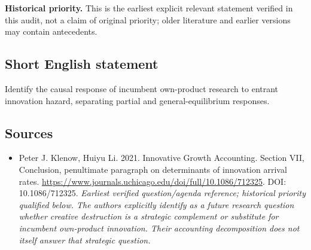 \documentclass[11pt]{article}
\begin{document}
\par\textbf{Historical priority.} This is the earliest explicit relevant statement verified in this audit, not a claim of original priority; older literature and earlier versions may contain antecedents.

\subsection{Short English statement}
Identify the causal response of incumbent own-product research to entrant innovation hazard, separating partial and general-equilibrium responses.

\subsection{Sources}
\begin{itemize}\raggedright
\item[\textnormal{[S1]}]\hypertarget{source:30007547:1}{} Peter J. Klenow, Huiyu Li. 2021. Innovative Growth Accounting. Section VII, Conclusion, penultimate paragraph on determinants of innovation arrival rates.
\url{https://www.journals.uchicago.edu/doi/full/10.1086/712325}.
DOI: 10.1086/712325.
{\small\textit{Earliest verified question/agenda reference; historical priority qualified below. The authors explicitly identify as a future research question whether creative destruction is a strategic complement or substitute for incumbent own-product innovation. Their accounting decomposition does not itself answer that strategic question.}}
\end{itemize}
\end{document}
